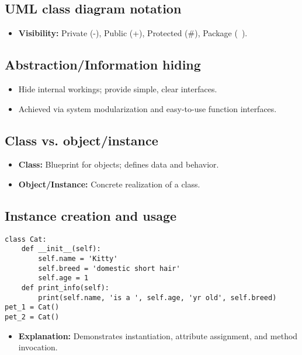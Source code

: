 \documentclass[11pt,a4paper]{article}
\begin{document}
\subsection*{UML class diagram notation}
\begin{itemize}
    \item \textbf{Visibility:} Private (-), Public (+), Protected (\#), Package (~).
\end{itemize}

\subsection*{Abstraction/Information hiding}
\begin{itemize}
    \item Hide internal workings; provide simple, clear interfaces.
    \item Achieved via system modularization and easy-to-use function interfaces.
\end{itemize}

\subsection*{Class vs. object/instance}
\begin{itemize}
    \item \textbf{Class:} Blueprint for objects; defines data and behavior.
    \item \textbf{Object/Instance:} Concrete realization of a class.
\end{itemize}

\subsection*{Instance creation and usage}
\begin{verbatim}
class Cat:
    def __init__(self):
        self.name = 'Kitty'
        self.breed = 'domestic short hair'
        self.age = 1
    def print_info(self):
        print(self.name, 'is a ', self.age, 'yr old', self.breed)
pet_1 = Cat()
pet_2 = Cat()
\end{verbatim}
\begin{itemize}
    \item \textbf{Explanation:} Demonstrates instantiation, attribute assignment, and method invocation.
\end{itemize}
\end{document}
